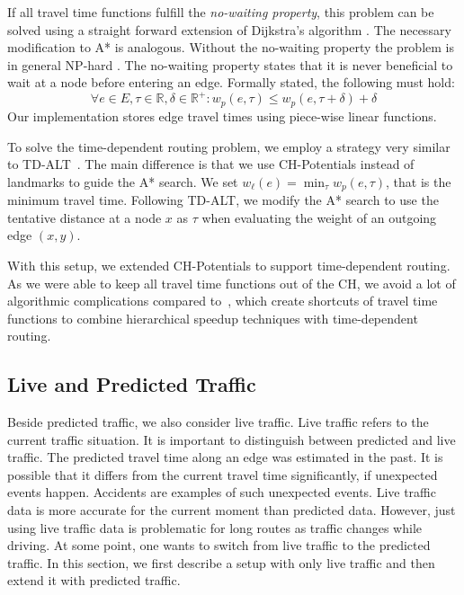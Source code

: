 \documentclass[letterpaper]{article} %
\begin{document}
If all travel time functions fulfill the \emph{no-waiting property}, this problem can be solved using a straight forward extension of Dijkstra's algorithm \cite{d-aassp-69}.
The necessary modification to A* is analogous.
Without the no-waiting property the problem is in general NP-hard \cite{or-tnp-89}.
The no-waiting property states that it is never beneficial to wait at a node before entering an edge.
Formally stated, the following must hold:\[
\forall e\in E,\tau\in \mathbb{R},\delta\in \mathbb{R}^+: w_p(e, \tau) \le w_p(e, \tau+\delta) + \delta
\]
Our implementation stores edge travel times using piece-wise linear functions.

To solve the time-dependent routing problem, we employ a strategy very similar to TD-ALT~\cite{ndls-bastd-12,dw-lbrdg-07}.
The main difference is that we use CH-Potentials instead of landmarks to guide the A* search.
We set $w_\ell(e) = \min_\tau w_p(e,\tau)$, that is the minimum travel time.
Following TD-ALT, we modify the A* search to use the tentative distance at a node $x$ as $\tau$ when evaluating the weight of an outgoing edge $(x,y)$.

With this setup, we extended CH-Potentials to support time-dependent routing.
As we were able to keep all travel time functions out of the CH, we avoid a lot of algorithmic complications compared to~\cite{bgsv-mtdtt-13,bdpw-dtdrp-16,swz-sfert-19}, which create shortcuts of travel time functions to combine hierarchical speedup techniques with time-dependent routing.

\subsection{Live and Predicted Traffic}
\label{sec:live-predicted-traffic}

Beside predicted traffic, we also consider live traffic.
Live traffic refers to the current traffic situation.
It is important to distinguish between predicted and live traffic.
The predicted travel time along an edge was estimated in the past.
It is possible that it differs from the current travel time significantly, if unexpected events happen.
Accidents are examples of such unexpected events.
Live traffic data is more accurate for the current moment than predicted data.
However, just using live traffic data is problematic for long routes as traffic changes while driving.
At some point, one wants to switch from live traffic to the predicted traffic.
In this section, we first describe a setup with only live traffic and then extend it with predicted traffic.
\end{document}

